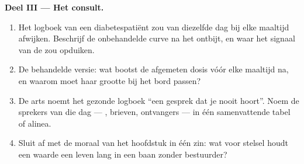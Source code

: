 \begin{problem}
\medskip\noindent\textbf{Deel III --- Het consult.}
\begin{enumerate}[resume]
  \item Het logboek van een diabetespatiënt zou van diezelfde dag bij elke
        maaltijd afwijken. Beschrijf de onbehandelde curve na het ontbijt,
        en waar het signaal van de  zou opduiken.
  \item De behandelde versie: wat bootst de afgemeten dosis vóór elke
        maaltijd na, en waarom moet haar grootte bij het bord passen?
  \item De arts noemt het gezonde logboek ``een gesprek dat je nooit
        hoort''. Noem de sprekers van die dag --- , brieven,
        ontvangers --- in één samenvattende tabel of alinea.
  \item Sluit af met de moraal van het hoofdstuk in één zin: wat voor
        stelsel houdt een waarde een leven lang in een baan zonder
        bestuurder?
\end{enumerate}
\end{problem}
